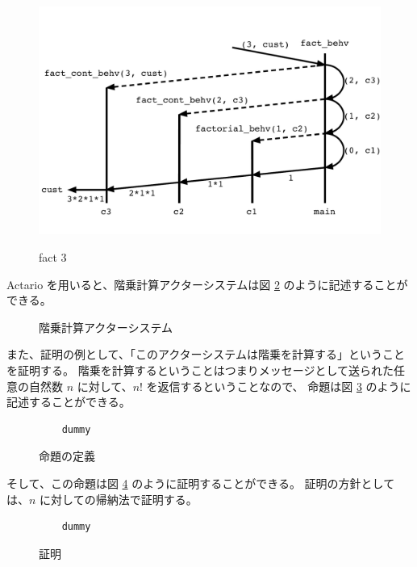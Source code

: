 \begin{figure}[tp]
  \includegraphics[width=14cm]{./img/overview/fact.pdf}
  \label{img:overview:fact}
  \caption{fact 3}
\end{figure}

Actario を用いると、階乗計算アクターシステムは図 \ref{code:overview:fact-impl} のように記述することができる。

\begin{figure}[tp]
  
  \label{code:overview:fact-impl}
  \caption{階乗計算アクターシステム}
\end{figure}

また、証明の例として、「このアクターシステムは階乗を計算する」ということを証明する。
階乗を計算するということはつまりメッセージとして送られた任意の自然数 $n$ に対して、$n!$ を返信するということなので、
命題は図 \ref{code:overview:fact-spec} のように記述することができる。

\begin{figure}[tp]
  \begin{lstlisting}
    dummy
  \end{lstlisting}
  \label{code:overview:fact-spec}
  \caption{命題の定義}
\end{figure}

そして、この命題は図 \ref{code:overview:fact-proof} のように証明することができる。
証明の方針としては、$n$ に対しての帰納法で証明する。

\begin{figure}[tp]
  \begin{lstlisting}
    dummy
  \end{lstlisting}
  \label{code:overview:fact-proof}
  \caption{証明}
\end{figure}
